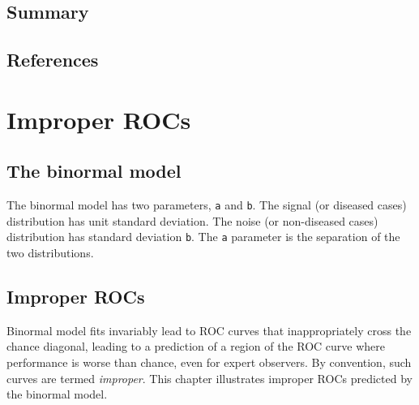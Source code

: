 \documentclass[
]{book}
\begin{document}
\hypertarget{summary-6}{%
\section{Summary}\label{summary-6}}

\hypertarget{references-10}{%
\section{References}\label{references-10}}

\hypertarget{ImproperROCs}{%
\chapter{Improper ROCs}\label{ImproperROCs}}

\hypertarget{the-binormal-model}{%
\section{The binormal model}\label{the-binormal-model}}

The binormal model has two parameters, \texttt{a} and \texttt{b}. The signal (or diseased cases) distribution has unit standard deviation.
The noise (or non-diseased cases) distribution has standard deviation \texttt{b}. The \texttt{a} parameter is the separation of the two distributions.

\hypertarget{improper-rocs}{%
\section{Improper ROCs}\label{improper-rocs}}

Binormal model fits invariably lead to ROC curves that inappropriately cross the chance diagonal, leading to a prediction of a region of the ROC curve where performance is worse than chance, even for expert observers. By convention, such curves are termed \emph{improper}. This chapter illustrates improper ROCs predicted by the binormal model.
\end{document}
